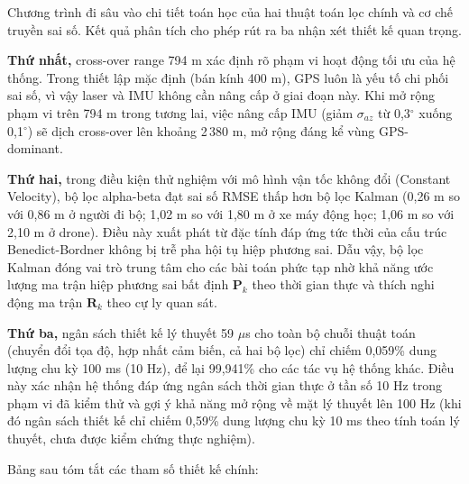 \hspace{0.5cm} Chương trình đi sâu vào chi tiết toán học của hai thuật toán lọc chính và cơ chế truyền sai số. Kết quả phân tích cho phép rút ra ba nhận xét thiết kế quan trọng.

\textbf{Thứ nhất,} cross-over range 794 m xác định rõ phạm vi hoạt động tối ưu của hệ thống. Trong thiết lập mặc định (bán kính 400 m), GPS luôn là yếu tố chi phối sai số, vì vậy laser và IMU không cần nâng cấp ở giai đoạn này. Khi mở rộng phạm vi trên 794 m trong tương lai, việc nâng cấp IMU (giảm $\sigma_{az}$ từ 0,3$^\circ$ xuống 0,1$^\circ$) sẽ dịch cross-over lên khoảng 2\,380 m, mở rộng đáng kể vùng GPS-dominant.

\textbf{Thứ hai,} trong điều kiện thử nghiệm với mô hình vận tốc không đổi (Constant Velocity), bộ lọc alpha-beta đạt sai số RMSE thấp hơn bộ lọc Kalman (0,26 m so với 0,86 m ở người đi bộ; 1,02 m so với 1,80 m ở xe máy động học; 1,06 m so với 2,10 m ở drone). Điều này xuất phát từ đặc tính đáp ứng tức thời của cấu trúc Benedict-Bordner không bị trễ pha hội tụ hiệp phương sai. Dẫu vậy, bộ lọc Kalman đóng vai trò trung tâm cho các bài toán phức tạp nhờ khả năng ước lượng ma trận hiệp phương sai bất định $\mathbf{P}_k$ theo thời gian thực và thích nghi động ma trận $\mathbf{R}_k$ theo cự ly quan sát.

\textbf{Thứ ba,} ngân sách thiết kế lý thuyết 59 $\mu$s cho toàn bộ chuỗi thuật toán (chuyển đổi tọa độ, hợp nhất cảm biến, cả hai bộ lọc) chỉ chiếm 0,059\% dung lượng chu kỳ 100 ms (10 Hz), để lại 99,941\% cho các tác vụ hệ thống khác. Điều này xác nhận hệ thống đáp ứng ngân sách thời gian thực ở tần số 10 Hz trong phạm vi đã kiểm thử và gợi ý khả năng mở rộng về mặt lý thuyết lên 100 Hz (khi đó ngân sách thiết kế chỉ chiếm 0,59\% dung lượng chu kỳ 10 ms theo tính toán lý thuyết, chưa được kiểm chứng thực nghiệm).

Bảng sau tóm tắt các tham số thiết kế chính:

